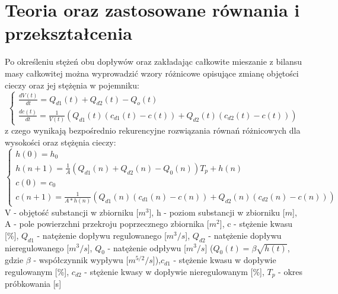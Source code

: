 \documentclass[polish,polish,a4paper,12pt]{article}
\begin{document}
	\section{Teoria oraz zastosowane równania i przekształcenia}
	Po określeniu stężeń obu dopływów oraz zakładając całkowite mieszanie z bilansu masy całkowitej można wyprowadzić wzory różnicowe opisujące zmianę objętości cieczy oraz jej stężęnia w pojemniku:
	\begin{equation}
	\begin{cases}
		\frac{dV(t)}{dt} = Q_{d1}(t) + Q_{d2}(t) - Q_{o}(t) \\
		\frac{dc(t)}{dt} = \frac{1}{V(t)}\left(Q_{d1}(t) \left(c_{d1}(t) - c(t)\right) + Q_{d2}(t)\left(c_{d2}(t) - c(t)\right)\right)		
	\end{cases}
	\end{equation}
	z czego wynikają bezpośrednio rekurencyjne rozwiązania równań różnicowych dla wysokości oraz stężęnia cieczy:
	\begin{equation}
	\begin{cases}
		h(0) = h_{0}\\
		h(n+1) =\frac{1}{A} \left(Q_{d1}(n) + Q_{d2}(n) - Q_{0}(n)\right)T_{p} + h(n)\\
		c(0) = c_{0}\\
		c(n+1) = \frac{1}{A*h(n)}\left(Q_{d1}(n)\left(c_{d1}(n) - c(n)\right) + Q_{d2}(n)\left(c_{d2}(n) - c(n)\right)\right)
	\end{cases}
	\end{equation}
	{\small V - objętość substancji w zbiorniku [$m^3$], \hspace{1em}h - poziom substancji w zbiorniku [$m$], \hspace{1em}A - pole powierzchni przekroju poprzecznego zbiornika [$m^2$], \hspace{1em}c - stężenie kwasu [\%], \hspace{1em}$Q_{d1}$ - natężenie dopływu regulowanego [$m^3/s$], \hspace{1em}$Q_{d2}$ - natężenie dopływu nieregulowanego [$m^3/s$], \hspace{1em} $Q_0$ - natężenie odpływu [$m^3/s$] ($Q_0(t) = \beta \sqrt{h(t)}$, gdzie $\beta$ - współczynnik wypływu [$m^{5/2}/s$]),\hspace{1em}$c_{d1}$ - stężenie kwasu w dopływie regulowanym [\%], \hspace{1em}$c_{d2}$ - stężenie kwasy w dopływie nieregulowanym [\%], \hspace{1em}$T_p$ - okres próbkowania [s]}\\
\end{document}

